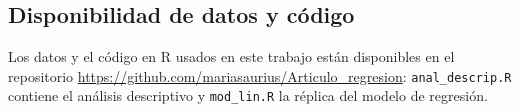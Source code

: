 
\subsection*{Disponibilidad de datos y código}

Los datos y el código en R usados en este trabajo están disponibles en el repositorio \url{https://github.com/mariasaurius/Articulo_regresion}: \texttt{anal\_descrip.R} contiene el análisis descriptivo y \texttt{mod\_lin.R} la réplica del modelo de regresión.
